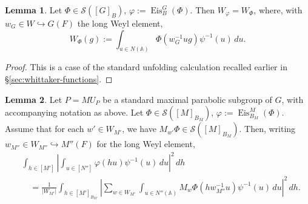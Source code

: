 \documentclass[reqno]{amsart}
\DeclareMathOperator{\Eis}{Eis}
\theoremstyle{plain} \newtheorem{theorem} {Theorem}
\theoremstyle{definition} \newtheorem{definition} [theorem] {Definition}
\theoremstyle{itplain} %
\newtheorem{lemma}[theorem]{Lemma}
\numberwithin{equation}{section}
\numberwithin{theorem}{section}
\begin{document}
\begin{lemma}\label{lem:sub-gln:let-phi-in-eval-W-eis}
  Let $\Phi \in \mathcal{S}([G]_B)$, $\varphi := \Eis_B^G(\Phi)$.  Then $W_{\varphi} = W_{\Phi}$, where, with $w_G \in W \hookrightarrow G(F)$ the long Weyl element,
  \begin{equation*}
    W_\Phi(g) := \int _{u \in N(\mathbb{A})} \Phi(w_G^{-1} u g) \psi^{-1}(u) \, d u.
  \end{equation*}
\end{lemma}
\begin{proof}
  This is a case of the standard unfolding calculation recalled earlier in \S\ref{sec:whittaker-functions}.
\end{proof}

\begin{lemma}\label{lem:sub-gln:let-p-=}
  Let $P = M {U_P}$ be a standard maximal parabolic subgroup of $G$, with accompanying notation as above.  Let $\Phi \in \mathcal{S}([M]_{B_M})$, $\varphi := \Eis_{B_M}^{M}(\Phi)$.  Assume that for each $w' \in W_{M'}$, we have $M_{w'} \Phi \in \mathcal{S}([M]_{B_M})$.  Then, writing $w_{M''} \in W_{M''} \hookrightarrow M''(F)$ for the long Weyl element,
  \begin{align*}
    &\int _{h \in [M']}
    \left\lvert \int _{u \in [N'']}
      \varphi(h u) \psi^{-1}(u) \, d u
    \right\rvert^2
    \, d h \\
    &\quad =
    \frac{1}{|W_{M'}|}
    \int _{h \in [M']_{B_{M'}}}
      \left\lvert
      \sum _{w \in W_{M'}}
      \int _{u \in N''(\mathbb{A})}
      M_w \Phi (h w_{M''}^{-1} u)
      \psi^{-1}(u) \, d u
    \right\rvert^2
     \, d h.
  \end{align*}
\end{lemma}
\end{document}

